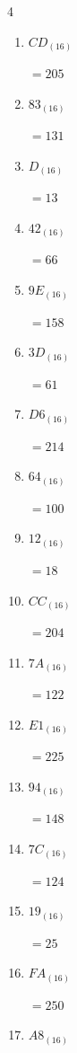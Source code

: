 \begin{multicols}{4}
\begin{enumerate}
  \item $CD_{(16)}$

        $=205$

  \item $83_{(16)}$

        $=131$

  \item $D_{(16)}$

        $=13$

  \item $42_{(16)}$

        $=66$

\columnbreak %

  \item $9E_{(16)}$

        $=158$

  \item $3D_{(16)}$

        $=61$

  \item $D6_{(16)}$

        $=214$

  \item $64_{(16)}$

        $=100$

  \item $12_{(16)}$

        $=18$

  \item $CC_{(16)}$

        $=204$

  \item $7A_{(16)}$

        $=122$

  \item $E1_{(16)}$

        $=225$

  \item $94_{(16)}$

        $=148$

  \item $7C_{(16)}$

        $=124$

  \item $19_{(16)}$

        $=25$

  \item $FA_{(16)}$

        $=250$

  \item $A8_{(16)}$


\end{enumerate}
\end{multicols}
